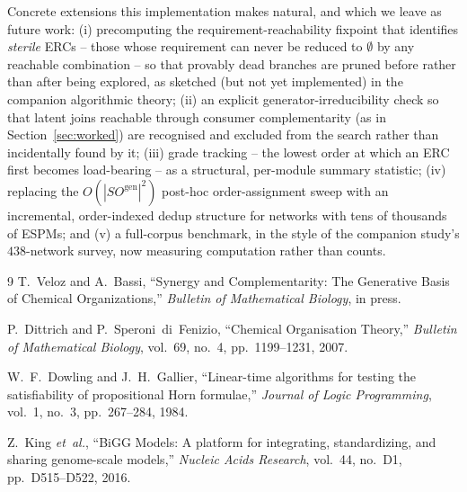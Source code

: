 \documentclass[11pt]{article}
\theoremstyle{plain}
\theoremstyle{remark}
\newcommand{\SOgen}{\mathit{SO}^{\mathrm{gen}}}
\begin{document}
Concrete extensions this implementation makes natural, and which we leave
as future work: (i) precomputing the requirement-reachability fixpoint
that identifies \emph{sterile} ERCs -- those whose requirement can never
be reduced to $\emptyset$ by any reachable combination -- so that
provably dead branches are pruned before rather than after being
explored, as sketched (but not yet implemented) in the companion
algorithmic theory; (ii) an explicit generator-irreducibility check so
that latent joins reachable through consumer complementarity (as in
Section~\ref{sec:worked}) are recognised and excluded from the search
rather than incidentally found by it; (iii) grade tracking -- the lowest
order at which an ERC first becomes load-bearing -- as a structural,
per-module summary statistic; (iv) replacing the $O(|\SOgen|^2)$ post-hoc
order-assignment sweep with an incremental, order-indexed dedup structure
for networks with tens of thousands of ESPMs; and (v) a full-corpus
benchmark, in the style of the companion study's $438$-network survey,
now measuring computation rather than counts.

\begin{thebibliography}{9}
T.~Veloz and A.~Bassi,
``Synergy and Complementarity: The Generative Basis of Chemical
Organizations,''
\textit{Bulletin of Mathematical Biology}, in press.

P.~Dittrich and P.~Speroni~di~Fenizio,
``Chemical Organisation Theory,''
\textit{Bulletin of Mathematical Biology}, vol.~69, no.~4,
pp.~1199--1231, 2007.

W.~F.~Dowling and J.~H.~Gallier,
``Linear-time algorithms for testing the satisfiability of propositional
Horn formulae,''
\textit{Journal of Logic Programming}, vol.~1, no.~3, pp.~267--284, 1984.

Z.~King \textit{et~al.},
``BiGG Models: A platform for integrating, standardizing, and sharing
genome-scale models,''
\textit{Nucleic Acids Research}, vol.~44, no.~D1, pp.~D515--D522, 2016.
\end{thebibliography}
\end{document}
